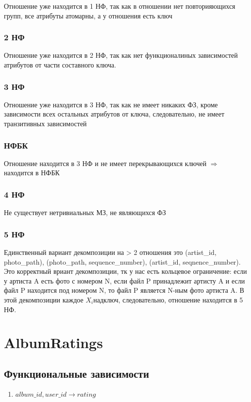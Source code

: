 \documentclass{article}
\begin{document}
Отношение уже находится в 1 НФ, так как в отношении нет повторияющихся групп, все атрибуты атомарны, а у отношения есть ключ

\subsubsection{2 НФ}

Отношение уже находится в 2 НФ, так как нет функционалиных зависимостей атрибутов от части составного ключа.

\subsubsection{3 НФ}

Отношение уже находится в 3 НФ, так как не имеет никаких ФЗ, кроме зависимости всех остальных атрибутов от ключа, следовательно, не имеет транзитивных зависимостей

\subsubsection{НФБК}

Отношение находится в 3 НФ и не имеет перекрывающихся ключей $\Rightarrow$ находится в НФБК

\subsubsection{4 НФ}

Не существует нетривиальных МЗ, не являющихся ФЗ

\subsubsection{5 НФ}
Единственный вариант декомпозиции на > 2 отношения это (artist\_id, photo\_path), (photo\_path, sequence\_number), (artist\_id, seqnence\_number). Это корректный вриант декомпозиции, тк у нас есть кольцевое ограничение: если у артиста A есть фото с номером N, если файл P принадлежит артисту A и если файл P находится под номером N, то файл P является N-ным фото артиста A. В этой декомпозиции каждое $X_i $надключ, следовательно, отношение находится в 5 НФ.

\section{AlbumRatings}

\subsection{Функциональные зависимости}
\begin{enumerate}
	\item $album\_id, user\_id \rightarrow rating$
\end{enumerate}
\end{document}
